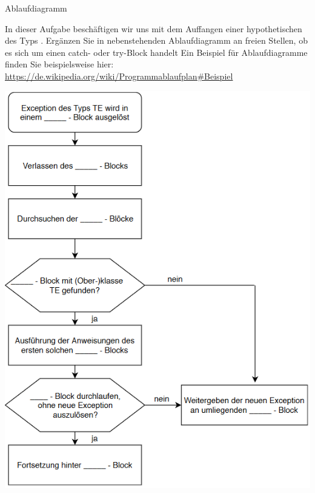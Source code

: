 \documentclass{../preamble}
\begin{document}
\begin{task}[credit = \stars{1}{3}]{Ablaufdiagramm}
    \begin{minipage}[t]{0.45\textwidth}
        \vspace{0pt}
        In dieser Aufgabe beschäftigen wir uns mit dem Auffangen einer hypothetischen  des Typs . Ergänzen Sie in nebenstehenden Ablaufdiagramm an freien Stellen, ob es sich um einen \textcolor{keywordcolor}{catch}- oder \textcolor{keywordcolor}{try}-Block handelt
        \br
        Ein Beispiel für Ablaufdiagramme finden Sie beispielsweise hier:
        \newline
        \url{https://de.wikipedia.org/wiki/Programmablaufplan#Beispiel}
    \end{minipage}
    \hfill
    \begin{minipage}[t]{0.45\textwidth}
        \vspace{0pt}
        \includegraphics[width = 1\textwidth]{graphics/V4_Task.png}
    \end{minipage}


\end{task}
\end{document}
